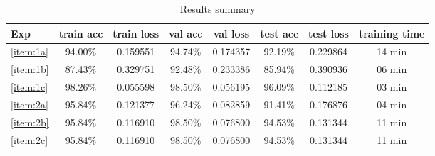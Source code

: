 \documentclass[10pt, a4paper]{article}
\begin{document}
\begin{table}[htpb]
  \centering
  \begin{tabular}{l|c|c|c|c|c|c|c|}
    Exp             &	train acc	       & train loss	    & val acc  & val loss	 & test acc	 & test loss & training time \\
    \hline
    \ref{item:1a}   & 94.00\%          & 0.159551       & 94.74\%  & 0.174357  & 92.19\%   & 0.229864  & 14 min        \\
    \ref{item:1b}   & 87.43\%          & 0.329751       & 92.48\%  & 0.233386  & 85.94\%   & 0.390936  & 06 min        \\
    \ref{item:1c}   & 98.26\%          & 0.055598       & 98.50\%  & 0.056195  & 96.09\%   & 0.112185  & 03 min        \\
    \ref{item:2a}   & 95.84\%          & 0.121377       & 96.24\%  & 0.082859  & 91.41\%   & 0.176876  & 04 min        \\
    \ref{item:2b}   & 95.84\%          & 0.116910       & 98.50\%  & 0.076800  & 94.53\%   & 0.131344  & 11 min        \\
    \ref{item:2c}   & 95.84\%          & 0.116910       & 98.50\%  & 0.076800  & 94.53\%   & 0.131344  & 11 min        \\
    \hline
  \end{tabular}
  \caption{Results summary}
  \label{tab:results_summ}
\end{table}









\end{document}
